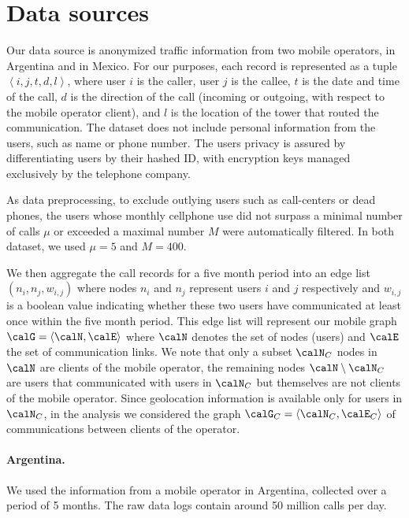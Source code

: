\section{Data sources}

Our data source is anonymized traffic information from two mobile operators, in Argentina and in Mexico.
For our purposes, each record is represented as a tuple $\left < i, j, t, d, l \right >$,
where user $i$ is the caller, user $j$ is the callee, $t$ is the date and time of the call,
$d$ is the direction of the call (incoming or outgoing, with respect to the mobile operator client), and $l$ is the location of the tower that routed the communication.
The dataset does not include personal information from the users, such as name or phone number. The users privacy is assured by differentiating users by their hashed ID, with encryption keys managed exclusively by the telephone company.

As data preprocessing, to exclude outlying users such as call-centers or dead phones, the users whose monthly cellphone use did not surpass a minimal number of calls $\mu$ or exceeded a maximal number $M$ were automatically filtered. In both dataset, we used $\mu = 5$ and $M = 400$.

We then aggregate the call records for a five 
month period into an edge list $(n_i, n_j, w_{i,j})$ where nodes $n_i$ and $n_j$ 
represent users $i$ and $j$ respectively and $w_{i,j}$ is a boolean value
indicating whether these two users have communicated at least once within the 
five month period. This edge list will represent our mobile graph  
$\calG = \left< \calN, \calE \right> $ where $\calN$ denotes the set of nodes (users) 
and $\calE$ the set of communication links. We note that only a subset $\calN_C$ nodes in $\calN$
are clients of the mobile operator, the remaining nodes $\calN \setminus \calN_C$ are
users that communicated with users in $ \calN_C $ but themselves are not clients of
the mobile operator. 
Since geolocation information is available only for users in $\calN_C$, in the analysis we considered the graph $\calG_C = \left< \calN_C, \calE_C \right> $ of communications between clients of the operator.

\paragraph{Argentina.} We used the information from a mobile operator in Argentina, collected over a period of 5 months. The raw data logs contain around 50 million calls per day.

